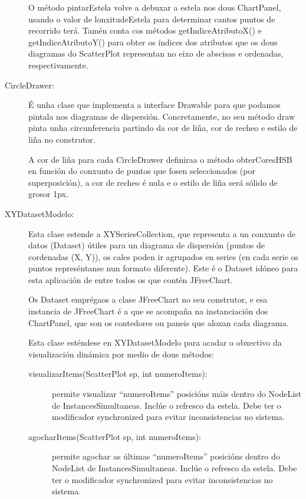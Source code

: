 \begin{description}
O método pintarEstela volve a debuxar a estela nos dous ChartPanel, usando o valor de lonxitudeEstela para determinar cantos puntos de recorrido terá. Tamén conta cos métodos getIndiceAtributoX() e getIndiceAtributoY() para obter os índices dos atributos que os dous diagramas do ScatterPlot representan no eixo de abscisas e ordenadas, respectivamente.

\item[CircleDrawer:] \hfill
É unha clase que implementa a interface Drawable para que podamos pintala nos diagramas de dispersión. Concretamente, no seu método draw pinta unha circunferencia partindo da cor de liña, cor de recheo e estilo de liña no construtor.

A cor de liña para cada CircleDrawer definiraa o método obterCoresHSB en función do conxunto de puntos que fosen seleccionados (por superposición), a cor de recheo é nula e o estilo de liña será sólido de grosor 1px.

\item[XYDatasetModelo:] \hfill
Esta clase estende a XYSeriesCollection, que representa a un conxunto de datos (Dataset) útiles para un diagrama de dispersión (puntos de cordenadas (X, Y)), os cales poden ir agrupados en series (en cada serie os puntos represéntanse nun formato diferente). Este é o Dataset idóneo para esta aplicación de entre todos os que contén JFreeChart.

Os Dataset emprégaos a clase JFreeChart no seu construtor, e esa instancia de JFreeChart é a que se acompaña na instanciación dos ChartPanel, que son os contedores ou paneis que aloxan cada diagrama.

Esta clase esténdese en XYDatasetModelo para acadar o obxectivo da visualización dinámica por medio de dous métodos:

\begin{description}
\item[visualizarItems(ScatterPlot sp, int numeroItems):] \hfill
permite visualizar ``numeroItems'' posicións máis dentro do NodeList de InstancesSimultaneas. Inclúe o refresco da estela. Debe ter o modificador synchronized para evitar inconsistencias no sistema.
\item[agocharItems(ScatterPlot sp, int numeroItems):] \hfill
permite agochar as últimas ``numeroItems'' posicións dentro do NodeList de InstancesSimultaneas. Inclúe o refresco da estela. Debe ter o modificador synchronized para evitar inconsistencias no sistema.
\end{description}


\end{description}
